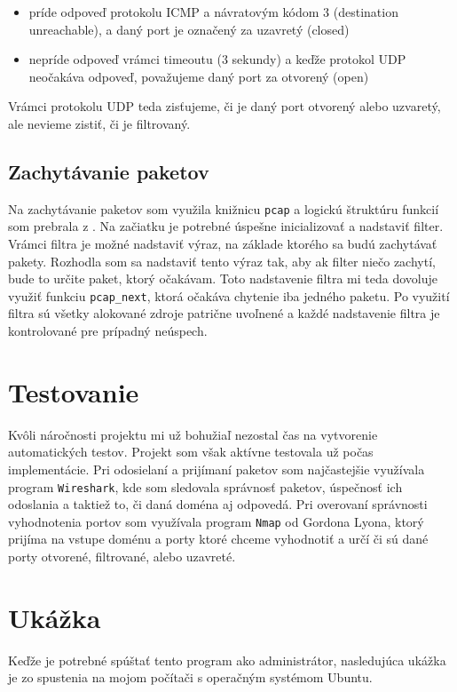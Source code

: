 \documentclass[11pt, a4paper]{article}
\begin{document}
\begin{itemize}
\item príde odpoveď protokolu ICMP a návratovým kódom 3 (destination unreachable), a daný port je označený za uzavretý (closed)
\item nepríde odpoveď vrámci timeoutu (3 sekundy) a keďže protokol UDP neočakáva odpoveď, považujeme daný port za otvorený (open)
\end{itemize}  

Vrámci protokolu UDP teda zisťujeme, či je daný port otvorený alebo uzvaretý, ale nevieme zistiť, či je filtrovaný.

\subsection{Zachytávanie paketov}
Na zachytávanie paketov som využila knižnicu \texttt{pcap} a logickú štruktúru funkcií som prebrala z \cite{pcap}. Na začiatku je potrebné úspešne inicializovať a nadstaviť filter. Vrámci filtra je možné nadstaviť výraz, na základe ktorého sa budú zachytávať pakety. Rozhodla som sa nadstaviť tento výraz tak, aby ak filter niečo zachytí, bude to určite paket, ktorý očakávam. Toto nadstavenie filtra mi teda dovoluje využiť funkciu \texttt{pcap\_next}, ktorá očakáva chytenie iba jedného paketu. Po využití filtra sú všetky alokované zdroje patrične uvoľnené a každé nadstavenie filtra je kontrolované pre prípadný neúspech.

\section{Testovanie}
Kvôli náročnosti projektu mi už bohužiaľ nezostal čas na vytvorenie automatických testov. Projekt som však aktívne testovala už počas implementácie. Pri odosielaní a prijímaní paketov som najčastejšie využívala  program \texttt{Wireshark}, kde som sledovala správnosť paketov, úspečnosť ich odoslania a taktiež to, či daná doména aj odpovedá. Pri overovaní správnosti vyhodnotenia portov som využívala program \texttt{Nmap} od Gordona Lyona, ktorý prijíma na vstupe doménu a porty ktoré chceme vyhodnotiť a určí či sú dané porty otvorené, filtrované, alebo uzavreté.

\section{Ukážka}
Keďže je potrebné spúštať tento program ako administrátor, nasledujúca ukážka je zo spustenia na mojom počítači s operačným systémom Ubuntu.\\
\end{document}
